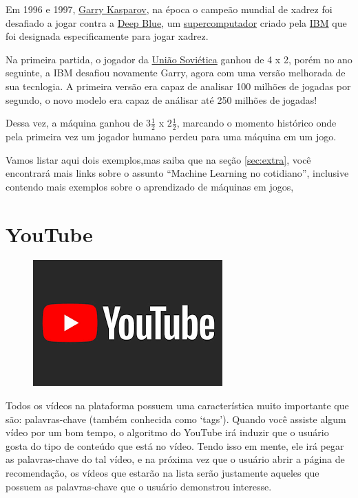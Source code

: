 \documentclass[12pt]{article}
\begin{document}
    Em 1996 e 1997, \href{https://pt.wikipedia.org/wiki/Garry_Kasparov}{Garry Kasparov}, 
    na época o campeão mundial de xadrez foi desafiado
    a jogar contra a \href{https://pt.wikipedia.org/wiki/Deep_Blue}{Deep Blue}, um \href{https://canaltech.com.br/produtos/o-que-e-supercomputador/}{supercomputador} 
    criado pela \href{https://pt.wikipedia.org/wiki/IBM}{IBM} que foi designada especificamente para jogar xadrez. 

    Na primeira partida, o jogador da \href{https://pt.wikipedia.org/wiki/Uni%C3%A3o_Sovi%C3%A9tica}{União Soviética} 
    ganhou de 4 x 2, porém no ano seguinte, a IBM desafiou novamente Garry, agora com uma versão melhorada de sua tecnlogia. A 
    primeira versão era capaz de analisar 100 milhões de jogadas por segundo, o novo modelo era capaz
    de análisar até 250 milhões de jogadas!

    Dessa vez, a máquina ganhou de \(3\frac{1}{2}\) x \(2\frac{1}{2}\), marcando o momento histórico 
    onde pela primeira vez um jogador humano perdeu para uma máquina em um jogo.

    Vamos listar aqui dois exemplos,mas saiba que na seção \ref{sec:extra}, você encontrará mais links sobre o assunto “Machine Learning no cotidiano”, inclusive
    contendo mais exemplos sobre o aprendizado de máquinas em jogos, 

    \newpage
    \section{YouTube} \label{sec:youtube}

    \begin{figure}[htp]
        \centering
        \includegraphics{youtube.png}
    \end{figure}

    Todos os vídeos na plataforma possuem uma característica muito importante
    que são: palavras-chave (também conhecida como ‘tags’). Quando você 
    assiste algum vídeo por um bom tempo, o algoritmo do YouTube irá induzir que 
    o usuário gosta do tipo de conteúdo que está no vídeo. Tendo isso em mente,
    ele irá pegar as palavras-chave do tal vídeo, e na próxima vez que o usuário 
    abrir a página de recomendação, os vídeos que estarão na lista serão 
    justamente aqueles que possuem as palavras-chave que o usuário demonstrou interesse.
\end{document}
